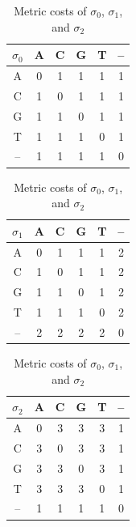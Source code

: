 \documentclass{bmcart}
\begin{document}
\begin{backmatter}
    \begin{table}[!hbt]
    	\caption{Metric costs of $\sigma_0$, $\sigma_1$, and $\sigma_2$}
    	\label{Tab:Metrics}
    	\begin{minipage}{0.3\textwidth}
    		\centering
    		\begin{tabular}{c|ccccc}
    			$\sigma_0$ & A & C & G & T & -- \\ \hline
    			A  & 0 & 1 & 1 & 1 & 1  \\
    			C  & 1 & 0 & 1 & 1 & 1  \\
    			G  & 1 & 1 & 0 & 1 & 1  \\
    			T  & 1 & 1 & 1 & 0 & 1  \\
    			-- & 1 & 1 & 1 & 1 & 0
    		\end{tabular}
    	\end{minipage}
    	\hfill
    	\begin{minipage}{0.33\textwidth}
    		\centering
    		\begin{tabular}{c|ccccc}
    			$\sigma_1$ & A & C & G & T & -- \\ \hline
    			A  & 0 & 1 & 1 & 1 & 2  \\
    			C  & 1 & 0 & 1 & 1 & 2  \\
    			G  & 1 & 1 & 0 & 1 & 2  \\
    			T  & 1 & 1 & 1 & 0 & 2  \\
    			-- & 2 & 2 & 2 & 2 & 0
    		\end{tabular}
    	\end{minipage}
    	\hfill
    	\begin{minipage}{0.3\textwidth}
    		\centering
    		\begin{tabular}{c|ccccc}
    			$\sigma_2$ & A & C & G & T & -- \\ \hline
    			A  & 0 & 3 & 3 & 3 & 1  \\
    			C  & 3 & 0 & 3 & 3 & 1  \\
    			G  & 3 & 3 & 0 & 3 & 1  \\
    			T  & 3 & 3 & 3 & 0 & 1  \\
    			-- & 1 & 1 & 1 & 1 & 0
    		\end{tabular}
    	\end{minipage}
    \end{table}
    

\end{backmatter}
\end{document}
